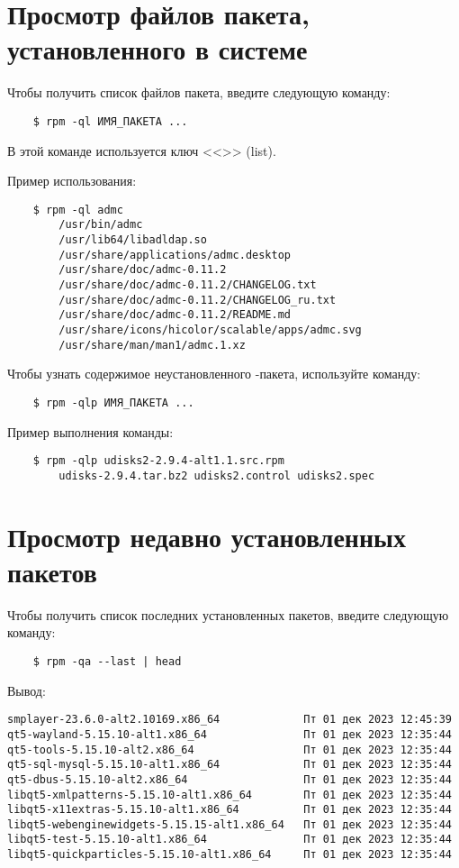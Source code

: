 \section{Просмотр файлов пакета, установленного в системе}
Чтобы получить список файлов пакета, введите следующую команду:
\begin{verbatim}
    $ rpm -ql ИМЯ_ПАКЕТА ...
\end{verbatim}

В этой команде используется ключ <<>> (list).


Пример использования:
\begin{verbatim}
    $ rpm -ql admc
        /usr/bin/admc
        /usr/lib64/libadldap.so
        /usr/share/applications/admc.desktop
        /usr/share/doc/admc-0.11.2
        /usr/share/doc/admc-0.11.2/CHANGELOG.txt
        /usr/share/doc/admc-0.11.2/CHANGELOG_ru.txt
        /usr/share/doc/admc-0.11.2/README.md
        /usr/share/icons/hicolor/scalable/apps/admc.svg
        /usr/share/man/man1/admc.1.xz
\end{verbatim}

Чтобы узнать содержимое неустановленного -пакета, используйте команду:
\begin{verbatim}
    $ rpm -qlp ИМЯ_ПАКЕТА ...
\end{verbatim}

Пример выполнения команды:
\begin{verbatim}
    $ rpm -qlp udisks2-2.9.4-alt1.1.src.rpm
        udisks-2.9.4.tar.bz2 udisks2.control udisks2.spec
\end{verbatim}

\section{Просмотр недавно установленных пакетов}\label{view-recently-installed-packages}
Чтобы получить список последних установленных пакетов, введите следующую команду:

\begin{verbatim}
    $ rpm -qa --last | head
\end{verbatim}

Вывод:
\begin{verbatim}
smplayer-23.6.0-alt2.10169.x86_64             Пт 01 дек 2023 12:45:39
qt5-wayland-5.15.10-alt1.x86_64               Пт 01 дек 2023 12:35:44
qt5-tools-5.15.10-alt2.x86_64                 Пт 01 дек 2023 12:35:44
qt5-sql-mysql-5.15.10-alt1.x86_64             Пт 01 дек 2023 12:35:44
qt5-dbus-5.15.10-alt2.x86_64                  Пт 01 дек 2023 12:35:44
libqt5-xmlpatterns-5.15.10-alt1.x86_64        Пт 01 дек 2023 12:35:44
libqt5-x11extras-5.15.10-alt1.x86_64          Пт 01 дек 2023 12:35:44
libqt5-webenginewidgets-5.15.15-alt1.x86_64   Пт 01 дек 2023 12:35:44
libqt5-test-5.15.10-alt1.x86_64               Пт 01 дек 2023 12:35:44
libqt5-quickparticles-5.15.10-alt1.x86_64     Пт 01 дек 2023 12:35:44
\end{verbatim}

